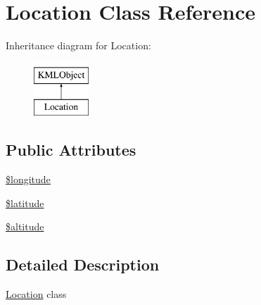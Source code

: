 \hypertarget{classLocation}{
\section{Location Class Reference}
\label{da/d05/classLocation}
}
Inheritance diagram for Location:\begin{figure}[H]
\begin{center}
\leavevmode
\includegraphics[height=2.000000cm]{da/d05/classLocation}
\end{center}
\end{figure}
\subsection*{Public Attributes}
\begin{DoxyCompactItemize}
\item 
\hyperlink{classLocation_adfec0a0d3ff62df48fdb88cc0b560660}{\$longitude}
\item 
\hyperlink{classLocation_ae15b3cd3b57a12528d55564c01ce03d2}{\$latitude}
\item 
\hyperlink{classLocation_a03c33cc85a087617110571262132db60}{\$altitude}
\end{DoxyCompactItemize}


\subsection{Detailed Description}
\hyperlink{classLocation}{Location} class 

